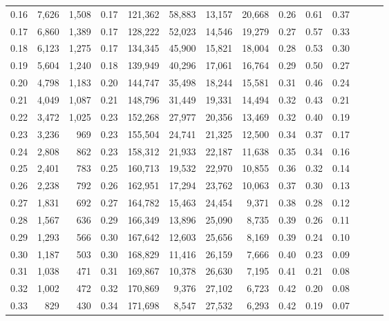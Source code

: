 \begin{tabular}{rrrrrrrrrrrrrr}
0.16 &   7,626 &  1,508 &  0.17 &  121,362 &   58,883 &  13,157 &  20,668 &  0.26 &  0.61 &      0.37 \\
0.17 &   6,860 &  1,389 &  0.17 &  128,222 &   52,023 &  14,546 &  19,279 &  0.27 &  0.57 &      0.33 \\
0.18 &   6,123 &  1,275 &  0.17 &  134,345 &   45,900 &  15,821 &  18,004 &  0.28 &  0.53 &      0.30 \\
0.19 &   5,604 &  1,240 &  0.18 &  139,949 &   40,296 &  17,061 &  16,764 &  0.29 &  0.50 &      0.27 \\
0.20 &   4,798 &  1,183 &  0.20 &  144,747 &   35,498 &  18,244 &  15,581 &  0.31 &  0.46 &      0.24 \\
0.21 &   4,049 &  1,087 &  0.21 &  148,796 &   31,449 &  19,331 &  14,494 &  0.32 &  0.43 &      0.21 \\
0.22 &   3,472 &  1,025 &  0.23 &  152,268 &   27,977 &  20,356 &  13,469 &  0.32 &  0.40 &      0.19 \\
0.23 &   3,236 &    969 &  0.23 &  155,504 &   24,741 &  21,325 &  12,500 &  0.34 &  0.37 &      0.17 \\
0.24 &   2,808 &    862 &  0.23 &  158,312 &   21,933 &  22,187 &  11,638 &  0.35 &  0.34 &      0.16 \\
0.25 &   2,401 &    783 &  0.25 &  160,713 &   19,532 &  22,970 &  10,855 &  0.36 &  0.32 &      0.14 \\
0.26 &   2,238 &    792 &  0.26 &  162,951 &   17,294 &  23,762 &  10,063 &  0.37 &  0.30 &      0.13 \\
0.27 &   1,831 &    692 &  0.27 &  164,782 &   15,463 &  24,454 &   9,371 &  0.38 &  0.28 &      0.12 \\
0.28 &   1,567 &    636 &  0.29 &  166,349 &   13,896 &  25,090 &   8,735 &  0.39 &  0.26 &      0.11 \\
0.29 &   1,293 &    566 &  0.30 &  167,642 &   12,603 &  25,656 &   8,169 &  0.39 &  0.24 &      0.10 \\
0.30 &   1,187 &    503 &  0.30 &  168,829 &   11,416 &  26,159 &   7,666 &  0.40 &  0.23 &      0.09 \\
0.31 &   1,038 &    471 &  0.31 &  169,867 &   10,378 &  26,630 &   7,195 &  0.41 &  0.21 &      0.08 \\
0.32 &   1,002 &    472 &  0.32 &  170,869 &    9,376 &  27,102 &   6,723 &  0.42 &  0.20 &      0.08 \\
0.33 &     829 &    430 &  0.34 &  171,698 &    8,547 &  27,532 &   6,293 &  0.42 &  0.19 &      0.07 \\

\end{tabular}
